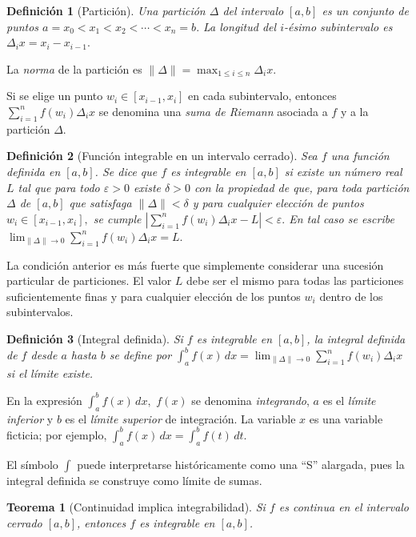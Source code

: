 \documentclass[12pt]{article}
\newtheorem{Def}{Definici\'on}
\newtheorem{Teo}{Teorema}
\begin{document}
\begin{Def}[Partición]
Una partición $\Delta$ del intervalo $[a,b]$ es un conjunto de puntos
$
a=x_0<x_1<x_2<\cdots<x_n=b.
$
La longitud del $i$-ésimo subintervalo es
$
\Delta_i x=x_i-x_{i-1}.
$
\end{Def}

La \emph{norma} de la partición es
$
\|\Delta\|
=
\max_{1\le i\le n}\Delta_i x.
$

Si se elige un punto
$
w_i\in[x_{i-1},x_i]
$
en cada subintervalo, entonces
$
\sum_{i=1}^{n}f(w_i)\Delta_i x
$
se denomina una \emph{suma de Riemann} asociada a $f$ y a la partición
$\Delta$.

\begin{Def}[Función integrable en un intervalo cerrado]
Sea $f$ una función definida en $[a,b]$. Se dice que $f$ es
\emph{integrable en $[a,b]$} si existe un número real $L$ tal que para todo
$\varepsilon>0$ existe $\delta>0$ con la propiedad de que, para toda partición
$\Delta$ de $[a,b]$ que satisfaga
$
\|\Delta\|<\delta
$
y para cualquier elección de puntos
$
w_i\in[x_{i-1},x_i],
$
se cumple
$
\left|
\sum_{i=1}^{n}f(w_i)\Delta_i x-L
\right|
<\varepsilon.
$
En tal caso se escribe
$
\lim_{\|\Delta\|\to0}
\sum_{i=1}^{n}f(w_i)\Delta_i x
=
L.
$
\end{Def}

La condición anterior es más fuerte que simplemente considerar una sucesión
particular de particiones. El valor $L$ debe ser el mismo para todas las
particiones suficientemente finas y para cualquier elección de los puntos
$w_i$ dentro de los subintervalos.

\begin{Def}[Integral definida]
Si $f$ es integrable en $[a,b]$, la integral definida de $f$ desde $a$ hasta
$b$ se define por
$
\boxed{
\int_a^b f(x)\,dx
=
\lim_{\|\Delta\|\to0}
\sum_{i=1}^{n}f(w_i)\Delta_i x
}
$
si el límite existe.
\end{Def}

En la expresión
$
\int_a^b f(x)\,dx,
$
$f(x)$ se denomina \emph{integrando}, $a$ es el \emph{límite inferior} y
$b$ es el \emph{límite superior} de integración. La variable $x$ es una
variable ficticia; por ejemplo,
$
\int_a^b f(x)\,dx
=
\int_a^b f(t)\,dt.
$

El símbolo $\int$ puede interpretarse históricamente como una ``S'' alargada,
pues la integral definida se construye como límite de sumas.

\begin{Teo}[Continuidad implica integrabilidad]
Si $f$ es continua en el intervalo cerrado $[a,b]$, entonces $f$ es integrable
en $[a,b]$.
\end{Teo}
\end{document}
